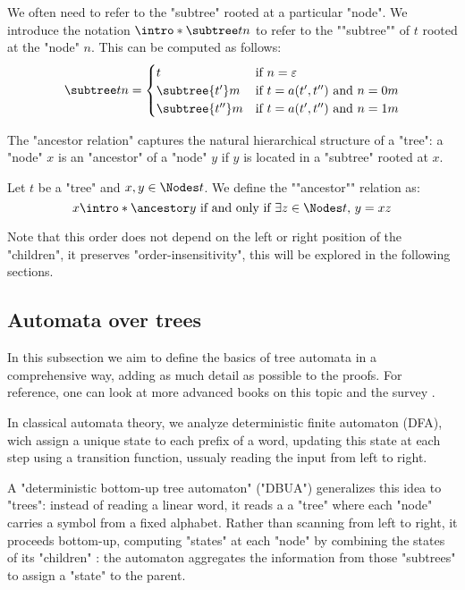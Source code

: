 \documentclass[a4paper,UKenglish,cleveref, autoref, thm-restate]{lipics-v2021}
\begin{document}
We often need to refer to the "subtree" rooted at a particular "node".
\AP We introduce the notation $\intro* \subtree t n$ to refer to the ""subtree""
of $t$ rooted at the "node" $n$. This can be computed as follows:
\[
	\subtree t n =   \begin{cases}
		t                & \text{if }  n = \varepsilon                  \\
		\subtree {t'} m  & \text{if } t = a(t',t'') \text{ and } n = 0m \\
		\subtree {t''} m & \text{if } t = a(t',t'') \text{ and } n = 1m
	\end{cases}
\]

The "ancestor relation" captures the natural hierarchical structure of a "tree": a "node" $x$ is an "ancestor"
of a "node" $y$ if $y$ is located in a "subtree" rooted at $x$.

\begin{definition}
	\AP Let $t$ be a "tree" and $x, y \in \Nodes t $. We define the ""ancestor"" relation as:
	\[
		x \intro* \ancestor y \tiff \exists z \in \Nodes t ,\, y = xz
	\]
\end{definition}

\begin{remark}
	Note that this order does not depend on the left or right position of the "children", \ie it preserves
	"order-insensitivity", this will be explored in the following sections.
\end{remark}


\subsection{Automata over trees}\label{sec:automata}

In this subsection we aim to define the basics of tree automata in a comprehensive way, adding as much detail as possible to the proofs. For reference,
one can look at more advanced books on this topic \cite{tata,bookautomata} and the survey \cite{Thomas1997}.

In classical automata theory, we analyze deterministic finite automaton (DFA), wich assign a unique state to each prefix of
a word, updating this state at each step using a transition function, ussualy reading the input from left to right.

A "deterministic bottom-up tree automaton" ("DBUA") generalizes this idea to "trees": instead of reading a linear word, it reads a
a "tree" where each "node" carries a symbol from a fixed alphabet. Rather than scanning from left to right, it proceeds
bottom-up, computing "states" at each "node" by combining the states of its "children" :
the automaton aggregates the information from those "subtrees" to assign a "state" to the parent.
\end{document}
